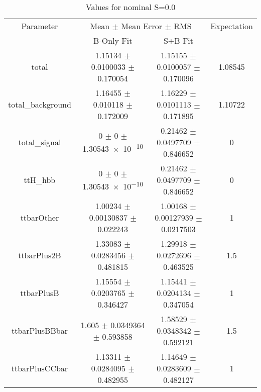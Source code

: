 \begin{table}
\centering
\caption{Values for nominal S=0.0}
\begin{tabular}{cccc}
\toprule
Parameter & \multicolumn{2}{c}{Mean $\pm$ Mean Error $\pm$ RMS} & Expectation\\
 & B-Only Fit & S+B Fit & \\
\midrule
total & \num{1.15134} $\pm$ \num{0.0100033} $\pm$ \num{0.170054} & \num{1.15155} $\pm$ \num{0.0100057} $\pm$ \num{0.170096} & \num{1.08545}\\
total\_background & \num{1.16455} $\pm$ \num{0.010118} $\pm$ \num{0.172009} & \num{1.16229} $\pm$ \num{0.0101113} $\pm$ \num{0.171895} & \num{1.10722}\\
total\_signal & \num{0} $\pm$ \num{0} $\pm$ \num{1.30543e-10} & \num{0.21462} $\pm$ \num{0.0497709} $\pm$ \num{0.846652} & \num{0}\\
ttH\_hbb & \num{0} $\pm$ \num{0} $\pm$ \num{1.30543e-10} & \num{0.21462} $\pm$ \num{0.0497709} $\pm$ \num{0.846652} & \num{0}\\
ttbarOther & \num{1.00234} $\pm$ \num{0.00130837} $\pm$ \num{0.022243} & \num{1.00168} $\pm$ \num{0.00127939} $\pm$ \num{0.0217503} & \num{1}\\
ttbarPlus2B & \num{1.33083} $\pm$ \num{0.0283456} $\pm$ \num{0.481815} & \num{1.29918} $\pm$ \num{0.0272696} $\pm$ \num{0.463525} & \num{1.5}\\
ttbarPlusB & \num{1.15554} $\pm$ \num{0.0203765} $\pm$ \num{0.346427} & \num{1.15441} $\pm$ \num{0.0204134} $\pm$ \num{0.347054} & \num{1}\\
ttbarPlusBBbar & \num{1.605} $\pm$ \num{0.0349364} $\pm$ \num{0.593858} & \num{1.58529} $\pm$ \num{0.0348342} $\pm$ \num{0.592121} & \num{1.5}\\
ttbarPlusCCbar & \num{1.13311} $\pm$ \num{0.0284095} $\pm$ \num{0.482955} & \num{1.14649} $\pm$ \num{0.0283609} $\pm$ \num{0.482127} & \num{1}\\
\bottomrule
\end{tabular}
\end{table}